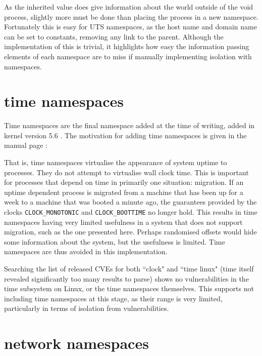 \documentclass[12pt,a4paper,twoside]{report}
\begin{document}
As the inherited value does give information about the world outside of the void process, slightly more must be done than placing the process in a new namespace. Fortunately this is easy for UTS namespaces, as the host name and domain name can be set to constants, removing any link to the parent. Although the implementation of this is trivial, it highlights how easy the information passing elements of each namespace are to miss if manually implementing isolation with namespaces.

\section{time namespaces}
\label{sec:voiding-time}

Time namespaces are the final namespace added at the time of writing, added in kernel version 5.6 \citep{linux_kernel_newbies_editors_linux_2020}. The motivation for adding time namespaces is given in the manual page \citep{free_software_foundation_time_namespaces7_2021}:


That is, time namespaces virtualise the appearance of system uptime to processes. They do not attempt to virtualise wall clock time. This is important for processes that depend on time in primarily one situation: migration. If an uptime dependent process is migrated from a machine that has been up for a week to a machine that was booted a minute ago, the guarantees provided by the clocks \texttt{CLOCK\_MONOTONIC} and \texttt{CLOCK\_BOOTTIME} no longer hold. This results in time namespaces having very limited usefulness in a system that does not support migration, such as the one presented here. Perhaps randomised offsets would hide some information about the system, but the usefulness is limited. Time namespaces are thus avoided in this implementation.

Searching the list of released CVEs for both ``clock" and ``time linux" (time itself revealed significantly too many results to parse) shows no vulnerabilities in the time subsystem on Linux, or the time namespaces themselves. This supports not including time namespaces at this stage, as their range is very limited, particularly in terms of isolation from vulnerabilities.

\section{network namespaces}
\label{sec:voiding-net}
\end{document}
